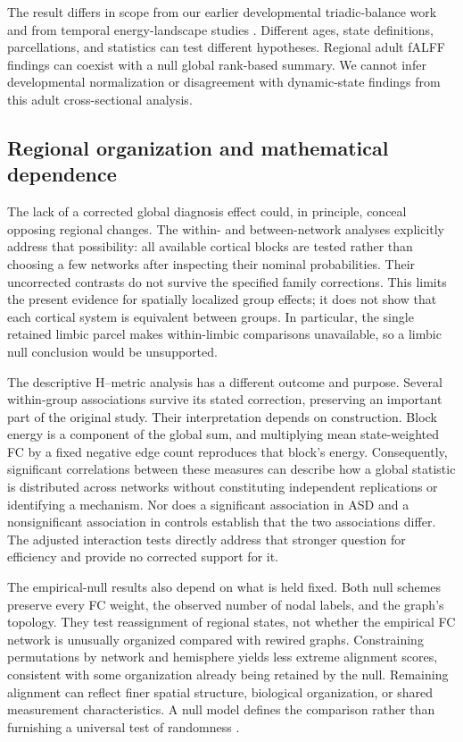 \documentclass[10pt,letterpaper]{article}
\begin{document}
The result differs in scope from our earlier developmental triadic-balance work
\cite{Moradimanesh2021} and from temporal energy-landscape studies
\cite{Watanabe2017revision}. Different ages, state definitions, parcellations, and
statistics can test different hypotheses. Regional adult fALFF findings
\cite{Itahashi2015revision} can coexist with a null global rank-based summary.
We cannot infer developmental normalization or disagreement with dynamic-state
findings from this adult cross-sectional analysis.

\subsection*{Regional organization and mathematical dependence}
The lack of a corrected global diagnosis effect could, in principle, conceal
opposing regional changes. The within- and between-network analyses explicitly
address that possibility: all available cortical blocks are tested rather than
choosing a few networks after inspecting their nominal probabilities. Their
uncorrected contrasts do not survive the specified family corrections. This
limits the present evidence for spatially localized group effects; it does not
show that each cortical system is equivalent between groups. In particular,
the single retained limbic parcel makes within-limbic comparisons unavailable,
so a limbic null conclusion would be unsupported.

The descriptive H--metric analysis has a different outcome and purpose. Several
within-group associations survive its stated correction, preserving an important
part of the original study. Their interpretation depends on construction.
Block energy is a component of the global sum, and multiplying mean
state-weighted FC by a fixed negative edge count reproduces that block's energy.
Consequently, significant correlations between these measures can describe how
a global statistic is distributed across networks without constituting
independent replications or identifying a mechanism. Nor does a significant
association in ASD and a nonsignificant association in controls establish that
the two associations differ. The adjusted interaction tests directly address
that stronger question for efficiency and provide no corrected support for it.

The empirical-null results also depend on what is held fixed. Both null schemes
preserve every FC weight, the observed number of nodal labels, and the graph's
topology. They test reassignment of regional states, not whether the empirical
FC network is unusually organized compared with rewired graphs. Constraining
permutations by network and hemisphere yields less extreme alignment scores,
consistent with some organization already being retained by the null. Remaining
alignment can reflect finer spatial structure, biological organization, or
shared measurement characteristics. A null model defines the comparison rather
than furnishing a universal test of randomness \cite{VasaMisic2022revision}.
\end{document}
